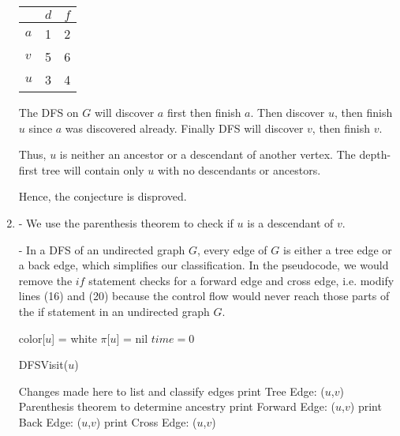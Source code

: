 \documentclass[a4paper]{report}
\begin{document}
\begin{enumerate}
      \begin{center}
        \begin{tabular}{ l | c | r }
          \hline
            & $d$ & $f$ \\ \hline
          $a$ & 1 & 2 \\
          $v$ & 5 & 6 \\
          $u$ & 3 & 4 \\
          \hline  
        \end{tabular}
      \end{center}


      The DFS on $G$ will discover $a$ first then finish $a$. Then discover $u$, then finish $u$ since
      $a$ was discovered already. Finally DFS will discover $v$, then finish $v$.

      Thus, $u$ is neither an ancestor or a descendant of another vertex. The depth-first tree
      will contain only $u$ with no descendants or ancestors. 

      Hence, the conjecture is disproved.

    \pagebreak
    \par
    \bigskip

    \item
      - We use the parenthesis theorem to check if $u$ is a descendant of $v$. 

      - In a DFS of an undirected graph $G$, every edge of $G$ is either a tree edge or a back edge, which simplifies
      our classification. In the pseudocode, we would remove the $if$ statement checks for a forward edge and cross edge, i.e.
      modify lines (16) and (20) because the control flow would never reach those parts of the if statement in an undirected
      graph $G$.

      \begin{algorithmic}[1]
        \State color[$u$] = white
        \State $\pi$[$u$] = nil
      \EndFor
      \State $time=0$


          \State DFSVisit($u$)
        \EndIf
      \EndFor

      \Comment Changes made here to list and classify edges
          \State print Tree Edge: ($u$,$v$)
        \Else 
          \Comment Parenthesis theorem to determine ancestry
            \State print Forward Edge: ($u$,$v$)
            \State print Back Edge: ($u$,$v$)
          \Else
            \State print Cross Edge: ($u$,$v$)
          \EndIf
        \EndIf
      \EndFor


\end{algorithmic}
\end{enumerate}
\end{document}

